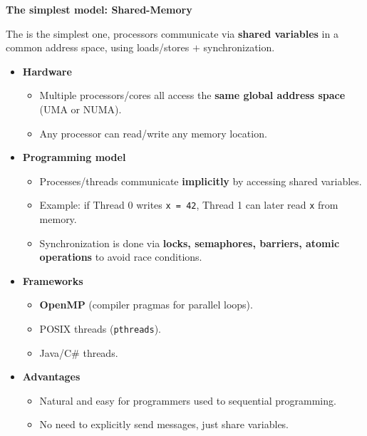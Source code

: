 \highspace
\begin{flushleft}
    \textcolor{Green3}{ \textbf{The simplest model: Shared-Memory}}
\end{flushleft}
The  is the simplest one, processors communicate via \textbf{shared variables} in a common address space, using loads/stores $+$ synchronization.
\begin{itemize}
    \item[\textcolor{Green3}{\faIcon{microchip}}] \textcolor{Green3}{\textbf{Hardware}}
    \begin{itemize}
        \item Multiple processors/cores all access the \textbf{same global address space} (UMA or NUMA).
        \item Any processor can read/write any memory location.
    \end{itemize}
    \item[\textcolor{Green3}{\faIcon{book}}] \textcolor{Green3}{\textbf{Programming model}}
    \begin{itemize}
        \item Processes/threads communicate \textbf{implicitly} by accessing shared variables.
        \item Example: if Thread 0 writes \texttt{x = 42}, Thread 1 can later read \texttt{x} from memory.
        \item Synchronization is done via \textbf{locks, semaphores, barriers, atomic operations} to avoid race conditions.
    \end{itemize}
    \item[\textcolor{Green3}{\faIcon{code}}] \textcolor{Green3}{\textbf{Frameworks}}
    \begin{itemize}
        \item \textbf{OpenMP} (compiler pragmas for parallel loops).
        \item POSIX threads (\texttt{pthreads}).
        \item Java/C\# threads.
    \end{itemize}
    \item[\textcolor{Green3}{\faIcon{check-circle}}] \textcolor{Green3}{\textbf{Advantages}}
    \begin{itemize}
        \item[\textcolor{Green3}{\faIcon{check}}] Natural and easy for programmers used to sequential programming.
        \item[\textcolor{Green3}{\faIcon{check}}] No need to explicitly send messages, just share variables.

\end{itemize}
\end{itemize}

